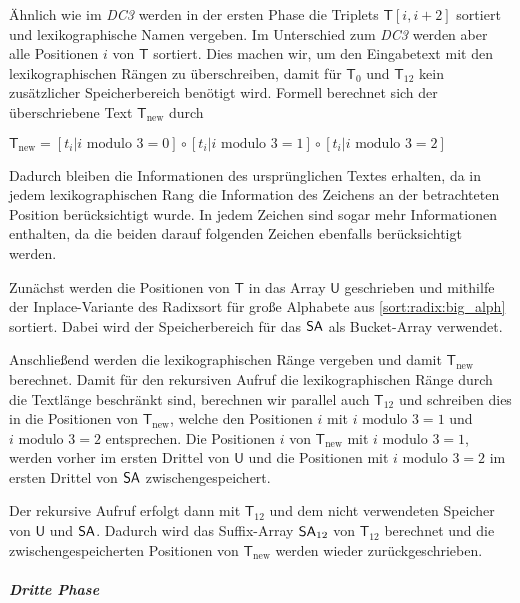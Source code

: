 Ähnlich wie im \emph{DC3} werden in der ersten Phase die Triplets $\mathsf{T}[i,i+2]$ sortiert und lexikographische Namen vergeben. Im Unterschied zum \emph{DC3} werden aber alle Positionen $i$ von $\mathsf{T}$ sortiert. Dies machen wir, um den Eingabetext mit den lexikographischen Rängen zu überschreiben, damit für $\mathsf{T}_0$ und $\mathsf{T}_{12}$ kein zusätzlicher Speicherbereich benötigt wird. Formell berechnet sich der überschriebene Text $\mathsf{T}_{\text{new}}$ durch 
\begin{center}
	$\mathsf{T}_{\text{new}} = [t_i | i \text{ modulo } 3 = 0] \circ [t_i | i \text{ modulo } 3 = 1] \circ [t_i | i \text{ modulo } 3 = 2]$ 
\end{center}
Dadurch bleiben die Informationen des ursprünglichen Textes erhalten, da in jedem lexikographischen Rang die Information des Zeichens an der betrachteten Position berücksichtigt wurde. In jedem Zeichen sind sogar mehr Informationen enthalten, da die beiden darauf folgenden Zeichen ebenfalls berücksichtigt werden. \par
Zunächst werden die Positionen von $\mathsf{T}$ in das Array $\mathsf{U}$ geschrieben und mithilfe der Inplace-Variante des Radixsort für große Alphabete aus \cref{sort:radix:big_alph} sortiert. Dabei wird der Speicherbereich für das $\sa$ als Bucket-Array verwendet. \par
Anschließend werden die lexikographischen Ränge vergeben und damit $\mathsf{T}_{\text{new}}$ berechnet. Damit für den rekursiven Aufruf die lexikographischen Ränge durch die Textlänge beschränkt sind, berechnen wir parallel auch $\mathsf{T}_{12}$ und schreiben dies in die Positionen von $\mathsf{T}_{\text{new}}$, welche den Positionen $i$ mit $i \text{ modulo } 3 = 1$ und $i \text{ modulo } 3 = 2$ entsprechen. Die Positionen $i$ von $\mathsf{T}_{\text{new}}$ mit $i \text{ modulo } 3 = 1$, werden vorher im ersten Drittel von $\mathsf{U}$ und die Positionen mit $i \text{ modulo } 3 = 2$ im ersten Drittel von $\sa$ zwischengespeichert. \par
Der rekursive Aufruf erfolgt dann mit $\mathsf{T}_{12}$ und dem nicht verwendeten Speicher von $\mathsf{U}$ und $\sa$. Dadurch wird das Suffix-Array $\sa_{12}$ von $\mathsf{T}_{12}$ berechnet und die zwischengespeicherten Positionen von $\mathsf{T}_{\text{new}}$ werden wieder zurückgeschrieben.


\subparagraph*{Dritte Phase}

